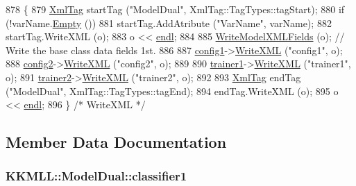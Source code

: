 \begin{DoxyCode}
878 \{
879   \hyperlink{class_k_k_b_1_1_xml_tag}{XmlTag}  startTag (\textcolor{stringliteral}{"ModelDual"},  XmlTag::TagTypes::tagStart);
880   \textcolor{keywordflow}{if}  (!varName.\hyperlink{class_k_k_b_1_1_k_k_str_ac69942f73fffd672ec2a6e1c410afdb6}{Empty} ())
881     startTag.AddAtribute (\textcolor{stringliteral}{"VarName"}, varName);
882   startTag.WriteXML (o);
883   o << \hyperlink{namespace_k_k_b_ad1f50f65af6adc8fa9e6f62d007818a8}{endl};
884 
885   \hyperlink{class_k_k_m_l_l_1_1_model_a560829876c8ca002f00592e428a780a2}{WriteModelXMLFields} (o);  \textcolor{comment}{// Write the base class data fields 1st.}
886 
887   \hyperlink{class_k_k_m_l_l_1_1_model_dual_a1d0f07c3ee783f1f91bcb5436c968908}{config1}->\hyperlink{class_k_k_m_l_l_1_1_training_configuration2_a72506f9e9d0fea4b855d4ffc101ab5ba}{WriteXML} (\textcolor{stringliteral}{"config1"}, o);
888   \hyperlink{class_k_k_m_l_l_1_1_model_dual_ae3a785cf1484bb40abe8d090312e6061}{config2}->\hyperlink{class_k_k_m_l_l_1_1_training_configuration2_a72506f9e9d0fea4b855d4ffc101ab5ba}{WriteXML} (\textcolor{stringliteral}{"config2"}, o);
889 
890   \hyperlink{class_k_k_m_l_l_1_1_model_dual_ac70e06e4290a0eca3cb79892170fdf6c}{trainer1}->\hyperlink{class_k_k_m_l_l_1_1_training_process2_a35cf9c0ab759e95b140b253b4db53c3b}{WriteXML} (\textcolor{stringliteral}{"trainer1"}, o);
891   \hyperlink{class_k_k_m_l_l_1_1_model_dual_aed7b1f99f54b08770555fb1e9c5d4b21}{trainer2}->\hyperlink{class_k_k_m_l_l_1_1_training_process2_a35cf9c0ab759e95b140b253b4db53c3b}{WriteXML} (\textcolor{stringliteral}{"trainer2"}, o);
892 
893   \hyperlink{class_k_k_b_1_1_xml_tag}{XmlTag}  endTag (\textcolor{stringliteral}{"ModelDual"}, XmlTag::TagTypes::tagEnd);
894   endTag.WriteXML (o);
895   o << \hyperlink{namespace_k_k_b_ad1f50f65af6adc8fa9e6f62d007818a8}{endl};
896 \}  \textcolor{comment}{/* WriteXML */}
\end{DoxyCode}


\subsection{Member Data Documentation}
\subsubsection[{\texorpdfstring{classifier1}{classifier1}}]{ K\+K\+M\+L\+L\+::\+Model\+Dual\+::classifier1\hspace{0.3cm}{\ttfamily [protected]}}\hypertarget{class_k_k_m_l_l_1_1_model_dual_a702b5e302cc05ab6cdc3ee4ae8115622}{}\label{class_k_k_m_l_l_1_1_model_dual_a702b5e302cc05ab6cdc3ee4ae8115622}


